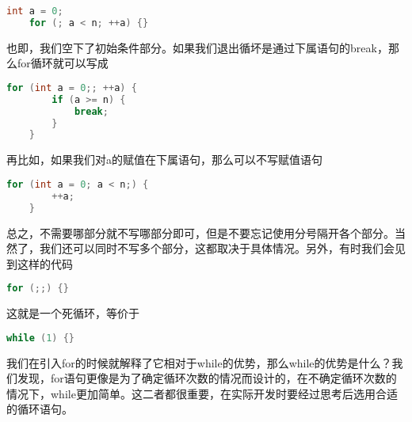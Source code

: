 \begin{lstlisting}[language=C]
    int a = 0;
    for (; a < n; ++a) {}
\end{lstlisting}

也即，我们空下了初始条件部分。如果我们退出循坏是通过下属语句的break，那么for循环就可以写成

\begin{lstlisting}[language=C]
    for (int a = 0;; ++a) {
        if (a >= n) {
            break;
        }
    }
\end{lstlisting}

再比如，如果我们对a的赋值在下属语句，那么可以不写赋值语句

\begin{lstlisting}[language=C]
    for (int a = 0; a < n;) {
        ++a;
    }
\end{lstlisting}

总之，不需要哪部分就不写哪部分即可，但是不要忘记使用分号隔开各个部分。当然了，我们还可以同时不写多个部分，这都取决于具体情况。另外，有时我们会见到这样的代码

\begin{lstlisting}[language=C]
    for (;;) {}
\end{lstlisting}

这就是一个死循环，等价于

\begin{lstlisting}[language=C]
    while (1) {}
\end{lstlisting}

我们在引入for的时候就解释了它相对于while的优势，那么while的优势是什么？我们发现，for语句更像是为了确定循环次数的情况而设计的，在不确定循环次数的情况下，while更加简单。这二者都很重要，在实际开发时要经过思考后选用合适的循环语句。
